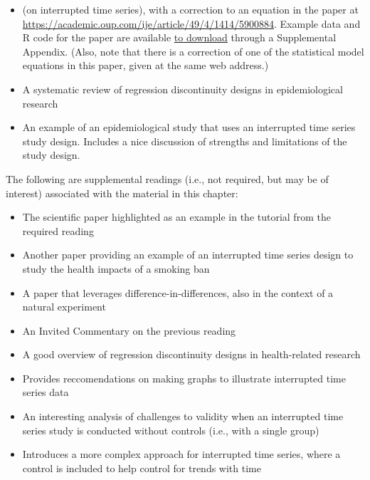 \documentclass[
]{book}
\providecommand{\tightlist}{%
  \setlength{\itemsep}{0pt}\setlength{\parskip}{0pt}}
\begin{document}
\begin{itemize}
\tightlist
\item
  \citet{bernal2017interrupted} (on interrupted time series), with a correction to an equation in the paper at \url{https://academic.oup.com/ije/article/49/4/1414/5900884}. Example data and R code for the paper are available \href{https://oup.silverchair-cdn.com/oup/backfile/Content_public/Journal/ije/49/4/10.1093_ije_dyaa118/1/dyaa118_supplementary_data.zip?Expires=1623897009\&Signature=BzYQrBg60cMKHYeDU~OIZYIFuRgEIPwQsWMjzON0dB~fL8y-8x4xdGIJQBBPgDxBIoUIGnjmShVf1jlVqzloo3IldAdVC78TZ~~XseYdJ9c590QRAR6m7mH~VbPe-fCnQSnZF0z2Qw9PZcSGITZeNr4YXPVY-~gtpgBeZiN0MpgEVBLVT5fYhhQBGbp0vxl1bKdUfNtF71fdVJrglkhSG8-M24A07LmAr8jThx4MQmSAzKCxA4VZLRE6To8zC3-rJlxyWiqrSTFsVQM2SN4R6UuxYoRsILRcIAr2sUfqgmaSlxBiYAf71PdGSrnBcXX3l0l7yuAftX5PYTwMKTyxOA__\&Key-Pair-Id=APKAIE5G5CRDK6RD3PGA}{to download} through a Supplemental Appendix. (Also, note that there is a correction of one of the statistical model equations in this paper, given at the same web address.)
\item
  \citet{bor2014regression} A systematic review of regression discontinuity designs in epidemiological research
\item
  \citet{lopez2013effect} An example of an epidemiological study that uses an interrupted time series study design. Includes a nice discussion of strengths and limitations of the study design.
\end{itemize}

The following are supplemental readings (i.e., not required, but may be of
interest) associated with the material in this chapter:

\begin{itemize}
\tightlist
\item
  \citet{barone2011effects} The scientific paper highlighted as an example in the tutorial from the required reading
\item
  \citet{sargent2004reduced} Another paper providing an example of an interrupted time series design to study the health impacts of a smoking ban
\item
  \citet{casey2018retirements} A paper that leverages difference-in-differences, also in the context of a natural experiment
\item
  \citet{mendola2018invited} An Invited Commentary on the previous reading
\item
  \citet{venkataramani2016regression} A good overview of regression discontinuity designs in health-related research
\item
  \citet{turner2021creating} Provides reccomendations on making graphs to illustrate interrupted time series data
\item
  \citet{linden2017challenges} An interesting analysis of challenges to validity when an interrupted time series study is conducted without controls (i.e., with a single group)
\item
  \citet{bottomley2019analysing} Introduces a more complex approach for interrupted time series, where a control is included to help control for trends with time
\end{itemize}
\end{document}
